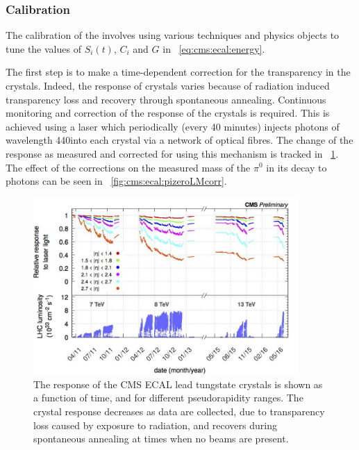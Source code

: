 \subsubsection{Calibration}
\label{sec:cms:ecal:calibration}

The calibration of the \ECAL involves using various techniques and physics objects to tune the values of $S_{i}(t)$, $C_{i}$ and $G$ in \Eq~\ref{eq:cms:ecal:energy}. 

The first step is to make a time-dependent correction for the transparency in the crystals. Indeed, the response of \ECAL crystals varies because of radiation induced transparency loss and recovery through spontaneous annealing. Continuous monitoring and correction of the response of the crystals is required. This is achieved using a laser which periodically (every 40 minutes) injects photons of wavelength 440\nm into each crystal via a network of optical fibres. The change of the response as measured and corrected for using this mechanism is tracked in \Fig~\ref{fig:cms:ecal:lasercorrections}. The effect of the corrections on the measured mass of the $\pi^0$ in its decay to photons can be seen in  \Fig~\ref{fig:cms:ecal:pizeroLMcorr}.

\begin{figure}[h]
\centering
\includegraphics[width=0.9\textwidth]{detectorFigures/EcalLaserCorrections.jpg}
\caption{The response of the CMS ECAL lead tungstate crystals is shown as a function of time, and for different pseudorapidity ranges. The crystal response decreases as data are collected, due to transparency loss caused by exposure to radiation, and recovers during spontaneous annealing at times when no beams are present. \cite{CMSECALPublic}}
\label{fig:cms:ecal:lasercorrections}
\end{figure}

